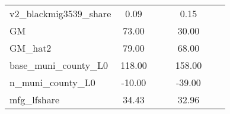 \begin{table}[htbp]
\begin{tabular}{l*{2}{ccc}}
v2\_blackmig3539\_share&        0.09&            &            &        0.15&            &            \\
GM                  &       73.00&            &            &       30.00&            &            \\
GM\_hat2             &       79.00&            &            &       68.00&            &            \\
base\_muni\_county\_L0 &      118.00&            &            &      158.00&            &            \\
n\_muni\_county\_L0    &      -10.00&            &            &      -39.00&            &            \\
mfg\_lfshare         &       34.43&            &            &       32.96&            &            \\
\bottomrule
\end{tabular}
\end{table}
